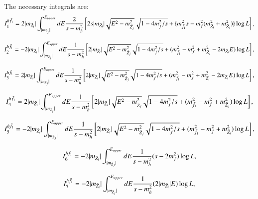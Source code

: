 \documentclass[final,3p,times]{elsarticle}
\begin{document}
The necessary integrals are:
\begin{equation}
I_{1}^{h \tilde{f}_1} = 2|m_{\tilde{Z}_i}|\int_{|m_{\tilde{Z}_j}|}^{E_{upper}} dE {2 \over s-m_{h}^2} \left[2s|m_{\tilde{Z}_i}|\sqrt{E^2 - m_{\tilde{Z}_j}^2}\sqrt{1-4m_{f}^2/s} + \{m_{\tilde{f}_1}^2 s - m_{f}^2 (m_{\tilde{Z}_i}^2 + m_{\tilde{Z}_j}^2)\} \log L\right],
\end{equation}

\begin{equation}
I_{2}^{h \tilde{f}_1} = -2|m_{\tilde{Z}_i}|\int_{|m_{\tilde{Z}_j}|}^{E_{upper}} dE {1 \over s-m_{h}^2} \left[2|m_{\tilde{Z}_i}|\sqrt{E^2 - m_{\tilde{Z}_j}^2}\sqrt{1-4m_{f}^2/s} + (m_{\tilde{f}_1}^2 - m_{f}^2 + m_{\tilde{Z}_j}^2 - 2m_{\tilde{Z}_i}E) \log L\right],
\end{equation}

\begin{equation}
I_{3}^{h \tilde{f}_1} = 2|m_{\tilde{Z}_i}|\int_{|m_{\tilde{Z}_j}|}^{E_{upper}} dE {1 \over s-m_{h}^2} \left[2|m_{\tilde{Z}_i}|\sqrt{E^2 - m_{\tilde{Z}_j}^2}\sqrt{1-4m_{f}^2/s} + (m_{\tilde{f}_1}^2 - m_{f}^2 + m_{\tilde{Z}_i}^2 - 2m_{\tilde{Z}_i}E) \log L\right],
\end{equation}

\begin{equation}
I_{4}^{h \tilde{f}_1} = 2|m_{\tilde{Z}_i}|\int_{|m_{\tilde{Z}_j}|}^{E_{upper}} dE {1 \over s-m_{h}^2} \left[2|m_{\tilde{Z}_i}|\sqrt{E^2 - m_{\tilde{Z}_j}^2}\sqrt{1-4m_{f}^2/s} + (m_{\tilde{f}_1}^2 - m_{f}^2 + m_{\tilde{Z}_j}^2 ) \log L\right],
\end{equation}

\begin{equation}
I_{5}^{h \tilde{f}_1} = -2|m_{\tilde{Z}_i}|\int_{|m_{\tilde{Z}_j}|}^{E_{upper}} dE {1 \over s-m_{h}^2} \left[2|m_{\tilde{Z}_i}|\sqrt{E^2 - m_{\tilde{Z}_j}^2}\sqrt{1-4m_{f}^2/s} + (m_{\tilde{f}_1}^2 - m_{f}^2 + m_{\tilde{Z}_i}^2 ) \log L\right],
\end{equation}

\begin{equation}
I_{6}^{h \tilde{f}_1} = -2|m_{\tilde{Z}_i}|\int_{|m_{\tilde{Z}_j}|}^{E_{upper}} dE {1 \over s-m_{h}^2} (s - 2m_{f}^2) \log L,
\end{equation}

\begin{equation}
I_{7}^{h \tilde{f}_1} = -2|m_{\tilde{Z}_i}|\int_{|m_{\tilde{Z}_j}|}^{E_{upper}} dE {1 \over s-m_{h}^2} (2|m_{\tilde{Z}_i}|E) \log L,
\end{equation}
\end{document}

